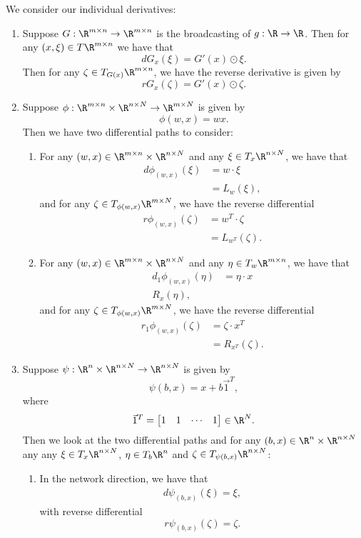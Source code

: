 We consider our individual derivatives:
\begin{enumerate}
	\item Suppose $G:\R^{m\times n}\to\R^{m\times n}$ is the broadcasting of $g:\R\to\R$.  Then for any $(x,\xi)\in T\R^{m\times n}$ we have that
	$$dG_x(\xi)=G'(x)\odot\xi.$$
	Then for any $\zeta\in T_{G(x)}\R^{m\times n}$, we have the reverse derivative is given by
	$$rG_x(\zeta)=G'(x)\odot\zeta.$$
	
	\item Suppose $\phi:\R^{m\times n}\times\R^{n\times N}\to\R^{m\times N}$ is given by
	$$\phi(w,x)=wx.$$
	Then we have two differential paths to consider:
	\begin{enumerate}
		\item For any $(w,x)\in \R^{m\times n}\times \R^{n\times N}$ and any $\xi\in T_x\R^{n\times N}$, we have that
		\begin{align*}
			d\phi_{(w,x)}(\xi)&=w\cdot\xi\\
			&=L_w(\xi),
		\end{align*}
		and for any $\zeta\in T_{\phi(w,x)}\R^{m\times N}$, we have the reverse differential
		\begin{align*}
			r\phi_{(w,x)}(\zeta)&=w^T\cdot\zeta\\
			&=L_{w^T}(\zeta).
		\end{align*}
		
		\item For any $(w,x)\in\R^{m\times n}\times \R^{n\times N}$ and any $\eta\in T_w\R^{m\times n}$, we have that
		\begin{align*}
			d_1\phi_{(w,x)}(\eta)&=\eta\cdot x\\
			R_x(\eta),
		\end{align*}
		and for any $\zeta\in T_{\phi(w,x)}\R^{m\times N}$, we have the reverse differential
		\begin{align*}
			r_1\phi_{(w,x)}(\zeta)&=\zeta\cdot x^T\\
			&=R_{x^T}(\zeta).
		\end{align*}
	\end{enumerate}
	
	\item Suppose $\psi:\R^n\times\R^{n\times N}\to\R^{n\times N}$ is given by
	$$\psi(b,x)=x+b\vec{1}^T,$$
	where
	$$\vec{1}^T=\begin{bmatrix}
		1&1&\cdots&1
	\end{bmatrix}\in\R^N.$$
	Then we look at the two differential paths and for any $(b,x)\in\R^n\times\R^{n\times N}$ any any $\xi\in T_x\R^{n\times N}$, $\eta\in T_b\R^n$ and $\zeta\in T_{\psi(b,x)}\R^{n\times N}$:
	\begin{enumerate}
		\item In the network direction, we have that
		\begin{align*}
			d\psi_{(b,x)}(\xi)=\xi,
		\end{align*}
		with reverse differential
		$$r\psi_{(b,x)}(\zeta)=\zeta.$$
		

\end{enumerate}
\end{enumerate}
